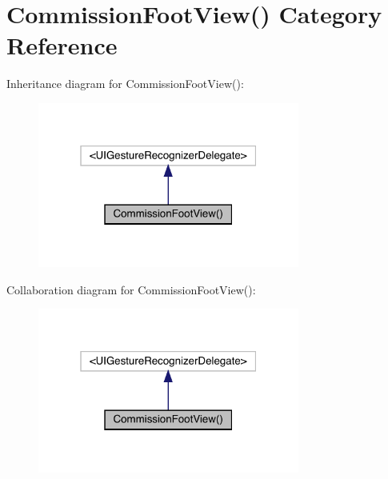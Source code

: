 \hypertarget{category_commission_foot_view_07_08}{}\section{Commission\+Foot\+View() Category Reference}
\label{category_commission_foot_view_07_08}


Inheritance diagram for Commission\+Foot\+View()\+:\nopagebreak
\begin{figure}[H]
\begin{center}
\leavevmode
\includegraphics[width=244pt]{category_commission_foot_view_07_08__inherit__graph}
\end{center}
\end{figure}


Collaboration diagram for Commission\+Foot\+View()\+:\nopagebreak
\begin{figure}[H]
\begin{center}
\leavevmode
\includegraphics[width=244pt]{category_commission_foot_view_07_08__coll__graph}
\end{center}
\end{figure}
